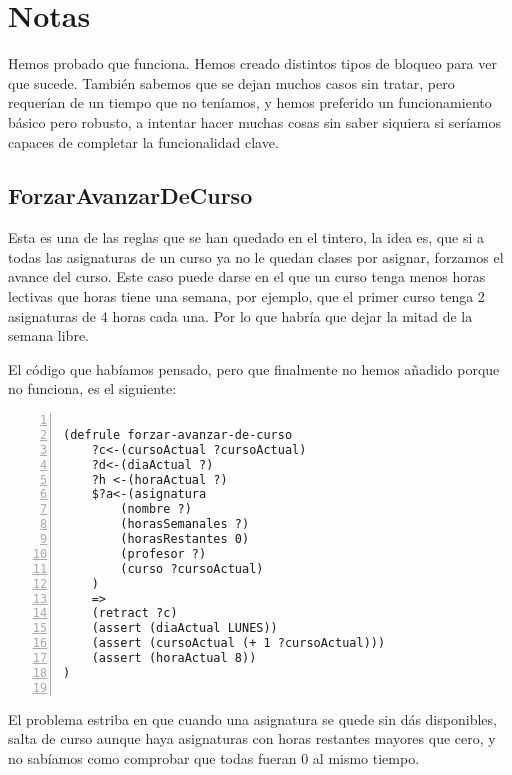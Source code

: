 \documentclass{report}
\begin{document}
\appendix
\chapter{Notas}
Hemos probado que funciona. Hemos creado distintos tipos de bloqueo para ver que sucede. Tambi\'{e}n sabemos que se dejan
muchos casos sin tratar, pero requer\'{i}an de un tiempo que no ten\'{i}amos, y hemos preferido un funcionamiento b\'{a}sico
pero robusto, a intentar hacer muchas cosas sin saber siquiera si ser\'{i}amos capaces de completar la funcionalidad clave.

\section{ForzarAvanzarDeCurso}
Esta es una de las reglas que se han quedado en el tintero, la idea es, que si a todas las asignaturas de un curso ya no le quedan clases
por asignar, forzamos el avance del curso. Este caso puede darse en el que un curso tenga menos horas lectivas que horas tiene una semana, 
por ejemplo, que el primer curso tenga 2 asignaturas de 4 horas cada una. Por lo que habr\'{i}a que dejar la mitad de la semana libre.

El c\'{o}digo que hab\'{i}amos pensado, pero que finalmente no hemos a\~{n}adido porque no funciona, es el siguiente:
\begin{lstlisting}[language=LISP, showspaces=false, numbers=left, breaklines=true]

(defrule forzar-avanzar-de-curso
    ?c<-(cursoActual ?cursoActual)
    ?d<-(diaActual ?)
    ?h <-(horaActual ?)
    $?a<-(asignatura 
        (nombre ?) 
        (horasSemanales ?) 
        (horasRestantes 0) 
        (profesor ?) 
        (curso ?cursoActual)
    )
    =>
    (retract ?c)
    (assert (diaActual LUNES))
    (assert (cursoActual (+ 1 ?cursoActual)))
    (assert (horaActual 8))
)
    
\end{lstlisting}

El problema estriba en que cuando una asignatura se quede sin d\'{a}s disponibles, salta de curso aunque haya asignaturas con horas restantes
mayores que cero, y no sab\'{i}amos como comprobar que todas fueran 0 al mismo tiempo.
\end{document}

